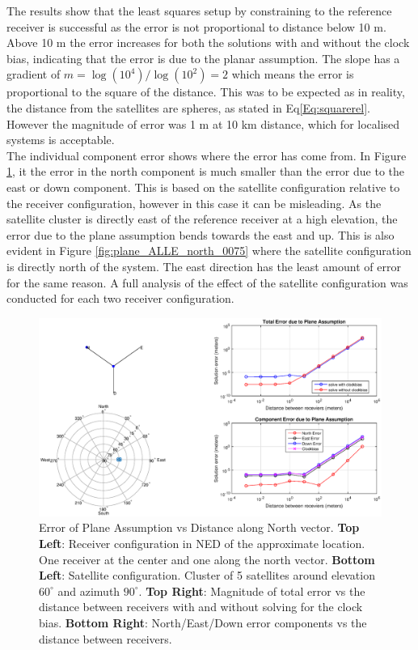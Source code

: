 The results show that the least squares setup by constraining to the reference receiver is successful as the error is not proportional to distance below 10 m. Above 10 m the error increases for both the solutions with and without the clock bias, indicating that the error is due to the planar assumption. The slope has a gradient of $m = \log(10^4)/\log(10^2) = 2$ which means the error is proportional to the square of the distance. This was to be expected as in reality, the distance from the satellites are spheres, as stated in Eq\eqref{Eq:squarerel}. However the magnitude of error was 1 m at 10 km distance, which for localised systems is acceptable.\\

The individual component error shows where the error has come from. In Figure \ref{fig:plane_ALLE_north_9060}, it the error in the north component is much smaller than the error due to the east or down component. This is based on the satellite configuration relative to the receiver configuration, however in this case it can be misleading. As the satellite cluster is directly east of the reference receiver at a high elevation, the error due to the plane assumption bends towards the east and up. This is also evident in Figure \ref{fig:plane_ALLE_north_0075} where the satellite configuration is directly north of the system. The east direction has the least amount of error for the same reason. A full analysis of the effect of the satellite configuration was conducted for each two receiver configuration.\\


\begin{figure}
\centering
\caption[Error of Plane Assumption vs Distance along North vector]{Error of Plane Assumption vs Distance along North vector. \textbf{Top Left}: Receiver configuration in NED of the approximate location. One receiver at the center and one along the north vector. \textbf{Bottom Left}: Satellite configuration. Cluster of 5 satellites around elevation $60^\circ$ and azimuth $90^\circ$. \textbf{Top Right}: Magnitude of total error vs the distance between receivers with and without solving for the clock bias. \textbf{Bottom Right}: North/East/Down error components vs the distance between receivers.}
\label{fig:plane_ALLE_north_9060}
\includegraphics[trim = 3cm 0 0 0,clip,width=\linewidth]{ChapterExperiments/Figures/plane_ALLE_north_9060}
\end{figure}

